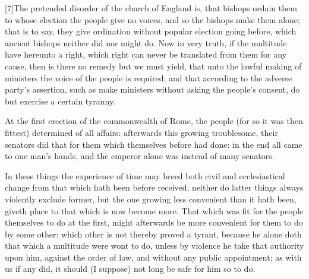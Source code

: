 [7]The pretended disorder of the church of England is, that bishops ordain them to whose election the people give no voices, and so the bishops make them alone; that is to say, they give ordination without popular election going before, which ancient bishops neither did nor might do. Now in very truth, if the multitude have hereunto a right, which right can never be translated from them for any cause, then is there no remedy but we must yield, that unto the lawful making of ministers the voice of the people is required; and that according to the adverse party’s assertion, such as make ministers without asking the people’s consent, do but exercise a certain tyranny.

At the first erection of the commonwealth of Rome, the  people (for so it was then fittest) determined of all affairs: afterwards this growing troublesome, their senators did that for them which themselves before had done: in the end all came to one man’s hands, and the emperor alone was instead of many senators.

In these things the experience of time may breed both civil and ecclesiastical change from that which hath been before received, neither do latter things always violently exclude former, but the one growing less convenient than it hath been, giveth place to that which is now become more. That which was fit for the people themselves to do at the first, might afterwards be more convenient for them to do by some other: which other is not thereby proved a tyrant, because he alone doth that which a multitude were wont to do, unless by violence he take that authority upon him, against the order of law, and without any public appointment; as with us if any did, it should (I suppose) not long be safe for him so to do.

